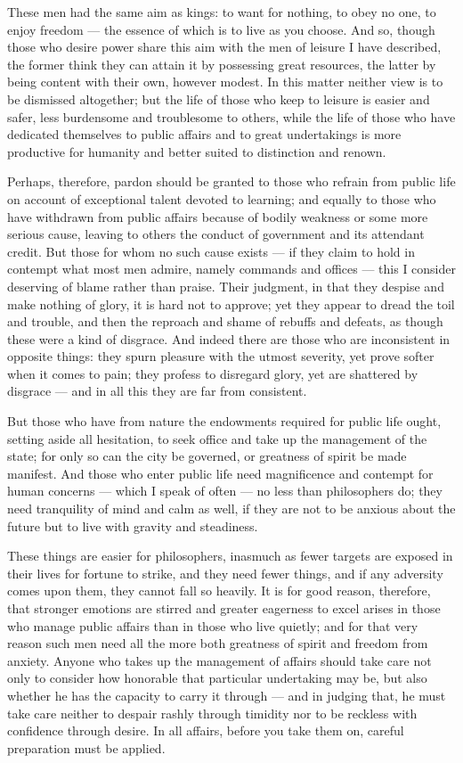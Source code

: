  These men had the same aim as kings: to want for nothing, to obey no one, to enjoy freedom — the essence of which is to live as you choose. And so, though those who desire power share this aim with the men of leisure I have described, the former think they can attain it by possessing great resources, the latter by being content with their own, however modest. In this matter neither view is to be dismissed altogether; but the life of those who keep to leisure is easier and safer, less burdensome and troublesome to others, while the life of those who have dedicated themselves to public affairs and to great undertakings is more productive for humanity and better suited to distinction and renown.

 Perhaps, therefore, pardon should be granted to those who refrain from public life on account of exceptional talent devoted to learning; and equally to those who have withdrawn from public affairs because of bodily weakness or some more serious cause, leaving to others the conduct of government and its attendant credit. But those for whom no such cause exists — if they claim to hold in contempt what most men admire, namely commands and offices — this I consider deserving of blame rather than praise. Their judgment, in that they despise and make nothing of glory, it is hard not to approve; yet they appear to dread the toil and trouble, and then the reproach and shame of rebuffs and defeats, as though these were a kind of disgrace. And indeed there are those who are inconsistent in opposite things: they spurn pleasure with the utmost severity, yet prove softer when it comes to pain; they profess to disregard glory, yet are shattered by disgrace — and in all this they are far from consistent.

 But those who have from nature the endowments required for public life ought, setting aside all hesitation, to seek office and take up the management of the state; for only so can the city be governed, or greatness of spirit be made manifest. And those who enter public life need magnificence and contempt for human concerns — which I speak of often — no less than philosophers do; they need tranquility of mind and calm as well, if they are not to be anxious about the future but to live with gravity and steadiness.

 These things are easier for philosophers, inasmuch as fewer targets are exposed in their lives for fortune to strike, and they need fewer things, and if any adversity comes upon them, they cannot fall so heavily. It is for good reason, therefore, that stronger emotions are stirred and greater eagerness to excel arises in those who manage public affairs than in those who live quietly; and for that very reason such men need all the more both greatness of spirit and freedom from anxiety. Anyone who takes up the management of affairs should take care not only to consider how honorable that particular undertaking may be, but also whether he has the capacity to carry it through — and in judging that, he must take care neither to despair rashly through timidity nor to be reckless with confidence through desire. In all affairs, before you take them on, careful preparation must be applied.

